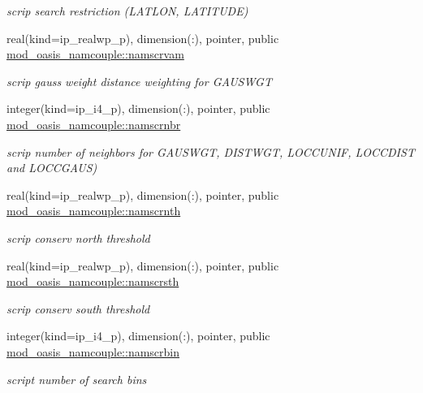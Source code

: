 \begin{DoxyCompactItemize}
\begin{DoxyCompactList}\small\item\em scrip search restriction (L\+A\+T\+L\+ON, L\+A\+T\+I\+T\+U\+DE) \end{DoxyCompactList}\item 
real(kind=ip\+\_\+realwp\+\_\+p), dimension(\+:), pointer, public \hyperlink{namespacemod__oasis__namcouple_a45b410743ce74a9824d44b329ba323ba}{mod\+\_\+oasis\+\_\+namcouple\+::namscrvam}
\begin{DoxyCompactList}\small\item\em scrip gauss weight distance weighting for G\+A\+U\+S\+W\+GT \end{DoxyCompactList}\item 
integer(kind=ip\+\_\+i4\+\_\+p), dimension(\+:), pointer, public \hyperlink{namespacemod__oasis__namcouple_a20d614468823744b82118ee8cf2df852}{mod\+\_\+oasis\+\_\+namcouple\+::namscrnbr}
\begin{DoxyCompactList}\small\item\em scrip number of neighbors for G\+A\+U\+S\+W\+GT, D\+I\+S\+T\+W\+GT, L\+O\+C\+C\+U\+N\+IF, L\+O\+C\+C\+D\+I\+ST and L\+O\+C\+C\+G\+A\+US) \end{DoxyCompactList}\item 
real(kind=ip\+\_\+realwp\+\_\+p), dimension(\+:), pointer, public \hyperlink{namespacemod__oasis__namcouple_a3118551c00a0292c1af684ece57cc8f0}{mod\+\_\+oasis\+\_\+namcouple\+::namscrnth}
\begin{DoxyCompactList}\small\item\em scrip conserv north threshold \end{DoxyCompactList}\item 
real(kind=ip\+\_\+realwp\+\_\+p), dimension(\+:), pointer, public \hyperlink{namespacemod__oasis__namcouple_a50eb998713e5557b9fbb81cab781b6a8}{mod\+\_\+oasis\+\_\+namcouple\+::namscrsth}
\begin{DoxyCompactList}\small\item\em scrip conserv south threshold \end{DoxyCompactList}\item 
integer(kind=ip\+\_\+i4\+\_\+p), dimension(\+:), pointer, public \hyperlink{namespacemod__oasis__namcouple_a728405e8f669b58d00c189abf8b62437}{mod\+\_\+oasis\+\_\+namcouple\+::namscrbin}
\begin{DoxyCompactList}\small\item\em script number of search bins \end{DoxyCompactList}\item 

\end{DoxyCompactItemize}
